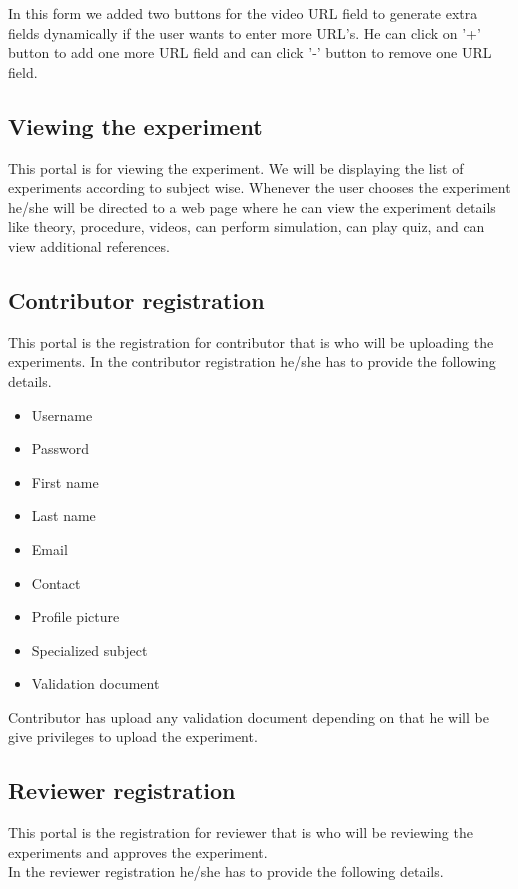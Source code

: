 \documentclass[12pt]{report}
\begin{document}
In this form we added two buttons for the video URL field to generate extra fields dynamically if the user wants to enter more URL’s. He can click on '+' button to add one more URL field and can click '-' button to remove one URL field.\\


\subsection{Viewing the experiment}

This portal is for viewing the experiment. We will be displaying the list of experiments according to subject wise. Whenever the user chooses the experiment he/she will be directed to a web page where he can view the experiment details like theory, procedure, videos, can perform simulation, can play quiz, and can view additional references.

\subsection{Contributor registration}

This portal is the registration for contributor that is who will be uploading the experiments.
In the contributor registration he/she has to provide the following details.

\begin{itemize}
\item Username
\item Password
\item First name
\item Last name
\item Email
\item Contact
\item Profile picture
\item Specialized subject
\item Validation document
\end{itemize}

Contributor has upload any validation document depending on that he will be give privileges to upload the experiment.

\subsection{Reviewer registration}

This portal is the registration for reviewer that is who will be reviewing the experiments and approves the experiment.\\
In the reviewer registration he/she has to provide the following details.
\end{document}
